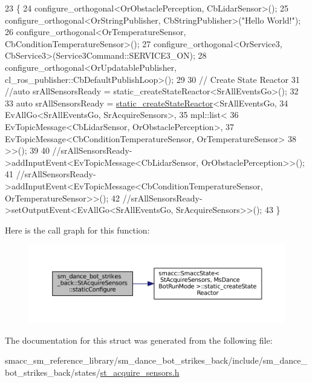 \begin{DoxyCode}
23    \{
24       configure\_orthogonal<OrObstaclePerception, CbLidarSensor>();
25       configure\_orthogonal<OrStringPublisher, CbStringPublisher>(\textcolor{stringliteral}{"Hello World!"});
26       configure\_orthogonal<OrTemperatureSensor, CbConditionTemperatureSensor>();
27       configure\_orthogonal<OrService3, CbService3>(Service3Command::SERVICE3\_ON);
28       configure\_orthogonal<OrUpdatablePublisher, cl\_ros\_publisher::CbDefaultPublishLoop>();
29 
30       \textcolor{comment}{// Create State Reactor}
31       \textcolor{comment}{//auto srAllSensorsReady = static\_createStateReactor<SrAllEventsGo>();}
32 
33       \textcolor{keyword}{auto} srAllSensorsReady = \hyperlink{classsmacc_1_1SmaccState_a892be704b48f93bf5c35635d1a58ed54}{static\_createStateReactor}<SrAllEventsGo,
34                                                          EvAllGo<SrAllEventsGo, SrAcquireSensors>,
35                                                          mpl::list<
36                                                                      EvTopicMessage<CbLidarSensor,
       OrObstaclePerception>,
37                                                                      
      EvTopicMessage<CbConditionTemperatureSensor, OrTemperatureSensor>
38                                                                   >>();
39 
40       \textcolor{comment}{//srAllSensorsReady->addInputEvent<EvTopicMessage<CbLidarSensor, OrObstaclePerception>>();}
41       \textcolor{comment}{//srAllSensorsReady->addInputEvent<EvTopicMessage<CbConditionTemperatureSensor,
       OrTemperatureSensor>>();}
42       \textcolor{comment}{//srAllSensorsReady->setOutputEvent<EvAllGo<SrAllEventsGo, SrAcquireSensors>>();}
43    \}
\end{DoxyCode}
Here is the call graph for this function\+:
\nopagebreak
\begin{figure}[H]
\begin{center}
\leavevmode
\includegraphics[width=350pt]{structsm__dance__bot__strikes__back_1_1StAcquireSensors_a83de29e9c8ce05f82c487b91255f9fe1_cgraph}
\end{center}
\end{figure}


The documentation for this struct was generated from the following file\+:\begin{DoxyCompactItemize}
\item 
smacc\+\_\+sm\+\_\+reference\+\_\+library/sm\+\_\+dance\+\_\+bot\+\_\+strikes\+\_\+back/include/sm\+\_\+dance\+\_\+bot\+\_\+strikes\+\_\+back/states/\hyperlink{sm__dance__bot__strikes__back_2include_2sm__dance__bot__strikes__back_2states_2st__acquire__sensors_8h}{st\+\_\+acquire\+\_\+sensors.\+h}\end{DoxyCompactItemize}
